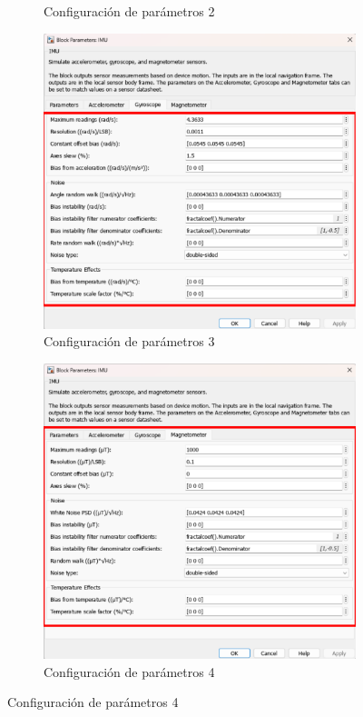 \begin{figure}[htbp]
\begin{subfigure}[b]{0.35\textwidth}
        \caption{Configuración de parámetros 2}
        \label{fig:parametros_IMU_02}
    \end{subfigure}
    \hfill
    \begin{subfigure}[b]{0.35\textwidth}
        \centering
        \includegraphics[width=\textwidth]{fig/Capitulo5/Caso_de_estudio_IMU/Generador_de_archivos/configuracion_parametros_IMU_03.pdf}
        \caption{Configuración de parámetros 3}
        \label{fig:parametros_IMU_03}
    \end{subfigure}
    \hfill
    \begin{subfigure}[b]{0.35\textwidth}
        \centering
        \includegraphics[width=\textwidth]{fig/Capitulo5/Caso_de_estudio_IMU/Generador_de_archivos/configuracion_parametros_IMU_04.pdf}
        \caption{Configuración de parámetros 4}
        \label{fig:parametros_IMU_04}
    \end{subfigure}


\end{figure}
